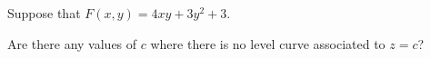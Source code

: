 \documentclass{ximera}
\author{Jim Talamo \and Jenny Sheldon \and Bart Snapp}
\begin{document}
\begin{exercise}
Suppose that $F(x,y) = 4xy+3y^2+3$.  

Are there any values of $c$ where there is no level curve associated to $z=c$?
\begin{prompt}
  \begin{multipleChoice}
  \end{multipleChoice}
\end{prompt}
\end{exercise}
\end{document}
